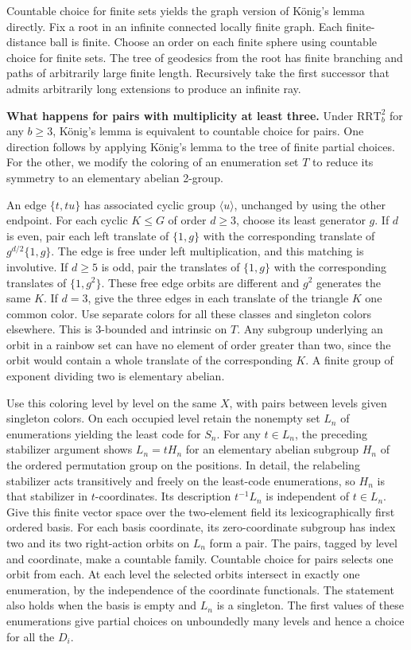 \documentclass[11pt]{article}
\begin{document}
Countable choice for finite sets yields the graph version of König's lemma directly. Fix a root in an infinite connected locally finite graph. Each finite-distance ball is finite. Choose an order on each finite sphere using countable choice for finite sets. The tree of geodesics from the root has finite branching and paths of arbitrarily large finite length. Recursively take the first successor that admits arbitrarily long extensions to produce an infinite ray.

\textbf{What happens for pairs with multiplicity at least three.} Under \(\mathrm{RRT}^2_b\) for any \(b\ge3\), König's lemma is equivalent to countable choice for pairs. One direction follows by applying König's lemma to the tree of finite partial choices. For the other, we modify the coloring of an enumeration set \(T\) to reduce its symmetry to an elementary abelian 2-group.

An edge \(\{t,tu\}\) has associated cyclic group \(\langle u\rangle\), unchanged by using the other endpoint. For each cyclic \(K\le G\) of order \(d\ge3\), choose its least generator \(g\). If \(d\) is even, pair each left translate of \(\{1,g\}\) with the corresponding translate of \(g^{d/2}\{1,g\}\). The edge is free under left multiplication, and this matching is involutive. If \(d\ge5\) is odd, pair the translates of \(\{1,g\}\) with the corresponding translates of \(\{1,g^2\}\). These free edge orbits are different and \(g^2\) generates the same \(K\). If \(d=3\), give the three edges in each translate of the triangle \(K\) one common color. Use separate colors for all these classes and singleton colors elsewhere. This is 3-bounded and intrinsic on \(T\). Any subgroup underlying an orbit in a rainbow set can have no element of order greater than two, since the orbit would contain a whole translate of the corresponding \(K\). A finite group of exponent dividing two is elementary abelian.

Use this coloring level by level on the same \(X\), with pairs between levels given singleton colors. On each occupied level retain the nonempty set \(L_n\) of enumerations yielding the least code for \(S_n\). For any \(t\in L_n\), the preceding stabilizer argument shows \(L_n=tH_n\) for an elementary abelian subgroup \(H_n\) of the ordered permutation group on the positions. In detail, the relabeling stabilizer acts transitively and freely on the least-code enumerations, so \(H_n\) is that stabilizer in \(t\)-coordinates. Its description \(t^{-1}L_n\) is independent of \(t\in L_n\). Give this finite vector space over the two-element field its lexicographically first ordered basis. For each basis coordinate, its zero-coordinate subgroup has index two and its two right-action orbits on \(L_n\) form a pair. The pairs, tagged by level and coordinate, make a countable family. Countable choice for pairs selects one orbit from each. At each level the selected orbits intersect in exactly one enumeration, by the independence of the coordinate functionals. The statement also holds when the basis is empty and \(L_n\) is a singleton. The first values of these enumerations give partial choices on unboundedly many levels and hence a choice for all the \(D_i\).
\end{document}
